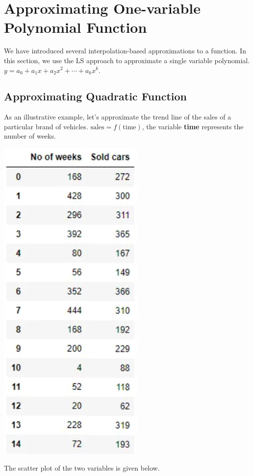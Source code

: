 \documentclass[
]{book}
\begin{document}
\hfill\break

\hypertarget{approximating-one-variable-polynomial-function}{%
\section{Approximating One-variable Polynomial Function}\label{approximating-one-variable-polynomial-function}}

We have introduced several interpolation-based approximations to a function. In this section, we use the LS approach to approximate a single variable polynomial. \(y = a_0 + a_1 x + a_2x^2 + \cdots + a_kx^k\).

\hfill\break

\hypertarget{approximating-quadratic-function}{%
\subsection{Approximating Quadratic Function}\label{approximating-quadratic-function}}

As an illustrative example, let's approximate the trend line of the sales of a particular brand of vehicles. \(\text{sales} = f(\text{time})\), the variable \textbf{time} represents the number of weeks.

\begin{center}\includegraphics[width=0.35\linewidth]{img14/w14-CarSaleTrendLine} \end{center}

The scatter plot of the two variables is given below.
\end{document}
